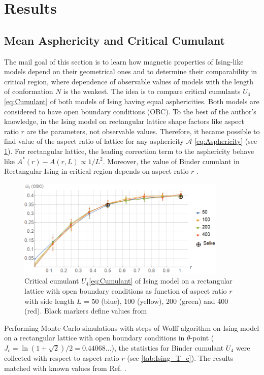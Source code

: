 \section{Results}

\subsection{Mean Asphericity and Critical Cumulant}

The mail goal of this section is to learn how magnetic properties of Ising-like models depend on their geometrical ones and to determine their comparability in critical region, where dependence of observable values of models with the length of conformation $N$ is the weakest. The idea is to compare critical cumulants $U_{4}$ \eqref{eq:Cumulant} of both models of Ising having equal asphericities. Both models are considered to have open boundary conditions (OBC). To the best of the author’s knowledge, in the Ising model on rectangular lattice shape factors like aspect ratio $r$ are the parameters, not observable values. Therefore, it became possible to find value of the aspect ratio of lattice for any asphericity $\mathcal{A}$ \eqref{eq:Asphericity} (see \cref{fig:A_r}). For rectangular lattice, the leading correction term to the asphericity behave like $A^{*}(r) - A(r, L) \propto 1 / L^{2}$. Moreover, the value of Binder cumulant in Rectangular Ising in critical region depends on aspect ratio $r$ \cite{Selke2006}.

\begin{figure}[h]
    \centering
    \includegraphics[width=100mm]{Images/CumulantOBC.png}
    \caption{Critical cumulant $U_{4}$\eqref{eq:Cumulant} of Ising model on a rectangular lattice with open boundary conditions as function of aspect ratio $r$ with side length $L$ = 50 (blue), 100 (yellow), 200 (green) and 400 (red). Black markers define values from \cite{Selke2006}}
    \label{fig:A_r}
\end{figure}

Performing Monte-Carlo simulations with steps of Wolff algorithm \cite{Newmanb1999} on Ising model on a rectangular lattice with open boundary conditions in $\theta$-point ($J_{c} = \ln{(1 + \sqrt{2}) / 2} =  0.44068... $), the statistics for Binder cumulant $U_{4}$ were collected with respect to aspect ratio $r$ (see \cref{tab:Ising_T_c}). The results matched with known values from Ref. \cite{Selke2006}.

